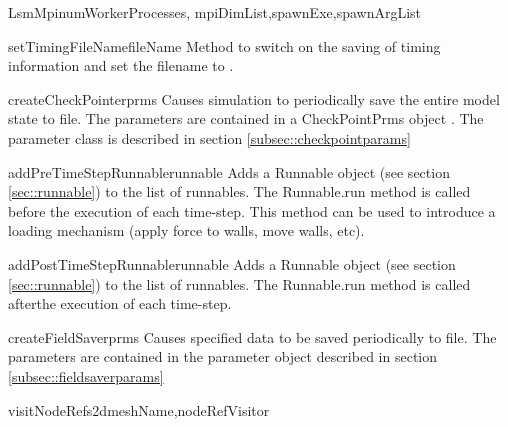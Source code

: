 \documentclass{manual}
\begin{document}
\begin{classdesc}{LsmMpi}{numWorkerProcesses, mpiDimList,spawnExe,spawnArgList}
\begin{methoddesc}{setTimingFileName}{fileName}
Method to switch on the saving of timing information and set the filename to .
\end{methoddesc}



\begin{methoddesc}{createCheckPointer}{prms}
Causes simulation to periodically save the entire model state to file. The parameters are contained in a CheckPointPrms object . The parameter class is described in section \ref{subsec::checkpointparams}
\end{methoddesc}

\begin{methoddesc}{addPreTimeStepRunnable}{runnable}
Adds a Runnable object  (see section \ref{sec::runnable}) to the list of runnables. The Runnable.run method is called before the execution of each time-step. This method can be used to introduce a loading mechanism (apply force to walls, move walls, etc).
\end{methoddesc}

\begin{methoddesc}{addPostTimeStepRunnable}{runnable}
Adds a Runnable object  (see section \ref{sec::runnable}) to the list of runnables. The Runnable.run method is called afterthe execution of each time-step. 
\end{methoddesc}

\begin{methoddesc}{createFieldSaver}{prms}
Causes specified data to be saved periodically to file. The parameters are contained in the parameter object  described in section \ref{subsec::fieldsaverparams}
\end{methoddesc}

\begin{methoddesc}{visitNodeRefs2d}{meshName,nodeRefVisitor}
\end{methoddesc}


\end{classdesc}
\end{document}
